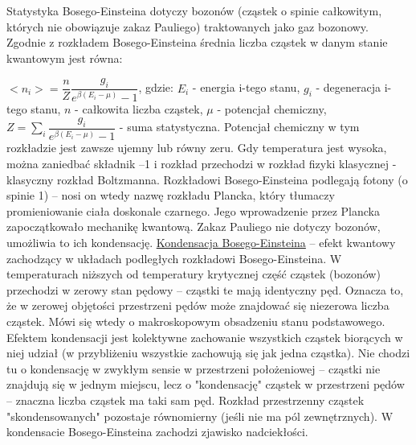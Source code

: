 Statystyka Bosego-Einsteina dotyczy bozonów (cząstek o spinie całkowitym, których nie obowiązuje zakaz Pauliego) traktowanych jako gaz bozonowy. Zgodnie z rozkładem Bosego-Einsteina średnia liczba cząstek w danym stanie kwantowym jest równa:

$ <n_i> = \dfrac{n}{Z}\dfrac{g_i}{e^{\beta(E_i-\mu)}-1} $, gdzie:\newline
$ E_i $ - energia i-tego stanu,\newline
$ g_i $ - degeneracja i-tego stanu,\newline
$ n $ - całkowita liczba cząstek,\newline
$ \mu $ - potencjał chemiczny,\newline
$ Z = \sum_{i}\dfrac{g_i}{e^{\beta(E_i-\mu)}-1} $ - suma statystyczna.\newline
Potencjał chemiczny w tym rozkładzie jest zawsze ujemny lub równy zeru. Gdy temperatura jest wysoka, można zaniedbać składnik –1 i rozkład przechodzi w rozkład fizyki klasycznej - klasyczny rozkład Boltzmanna. Rozkładowi Bosego-Einsteina podlegają fotony (o spinie 1) – nosi on wtedy nazwę rozkładu Plancka, który tłumaczy promieniowanie ciała doskonale czarnego. Jego wprowadzenie przez Plancka zapoczątkowało mechanikę kwantową. Zakaz Pauliego nie dotyczy bozonów, umożliwia to ich kondensację.
\underline{Kondensacja Bosego-Einsteina} – efekt kwantowy zachodzący w układach podległych rozkładowi Bosego-Einsteina. W temperaturach niższych od temperatury krytycznej część cząstek (bozonów) przechodzi w zerowy stan pędowy – cząstki te mają identyczny pęd. Oznacza to, że w zerowej objętości przestrzeni pędów może znajdować się niezerowa liczba cząstek. Mówi się wtedy o makroskopowym obsadzeniu stanu podstawowego. Efektem kondensacji jest kolektywne zachowanie wszystkich cząstek biorących w niej udział (w przybliżeniu wszystkie zachowują się jak jedna cząstka). Nie chodzi tu o kondensację w zwykłym sensie w przestrzeni położeniowej – cząstki nie znajdują się w jednym miejscu, lecz o "kondensację" cząstek w przestrzeni pędów – znaczna liczba cząstek ma taki sam pęd. Rozkład przestrzenny cząstek "skondensowanych" pozostaje równomierny (jeśli nie ma pól zewnętrznych). W kondensacie Bosego-Einsteina zachodzi zjawisko nadciekłości. 
